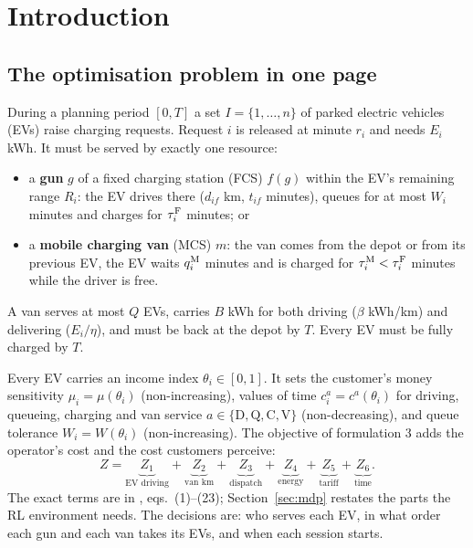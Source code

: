 \section{Introduction}
\label{sec:intro}

\subsection{The optimisation problem in one page}

During a planning period $[0,T]$ a set $I=\{1,\dots,n\}$ of parked electric vehicles (EVs) raise charging requests. Request $i$ is released at minute $r_i$ and needs $E_i$ kWh. It must be served by exactly one resource:
\begin{itemize}
  \item a \textbf{gun} $g$ of a fixed charging station (FCS) $f(g)$ within the EV's remaining range $R_i$: the EV drives there ($d_{if}$ km, $t_{if}$ minutes), queues for at most $W_i$ minutes and charges for $\tau^{\mathrm{F}}_i$ minutes; or
  \item a \textbf{mobile charging van} (MCS) $m$: the van comes from the depot or from its previous EV, the EV waits $q^{\mathrm{M}}_i$ minutes and is charged for $\tau^{\mathrm{M}}_i<\tau^{\mathrm{F}}_i$ minutes while the driver is free.
\end{itemize}
A van serves at most $Q$ EVs, carries $B$ kWh for both driving ($\beta$ kWh/km) and delivering ($E_i/\eta$), and must be back at the depot by $T$. Every EV must be fully charged by $T$.

Every EV carries an income index $\theta_i\in[0,1]$. It sets the customer's money sensitivity $\mu_i=\mu(\theta_i)$ (non-increasing), values of time $c^{a}_i=c^{a}(\theta_i)$ for driving, queueing, charging and van service $a\in\{\mathrm D,\mathrm Q,\mathrm C,\mathrm V\}$ (non-decreasing), and queue tolerance $W_i=W(\theta_i)$ (non-increasing). The objective of formulation 3 adds the operator's cost and the cost customers perceive:
\begin{equation}
Z=\underbrace{Z_1}_{\text{EV driving}}+\underbrace{Z_2}_{\text{van km}}+\underbrace{Z_3}_{\text{dispatch}}+\underbrace{Z_4}_{\text{energy}}+\underbrace{Z_5}_{\text{tariff}}+\underbrace{Z_6}_{\text{time}} .
\label{eq:Z}
\end{equation}
The exact terms are in , eqs.\ (1)--(23); Section~\ref{sec:mdp} restates the parts the RL environment needs. The decisions are: who serves each EV, in what order each gun and each van takes its EVs, and when each session starts.


